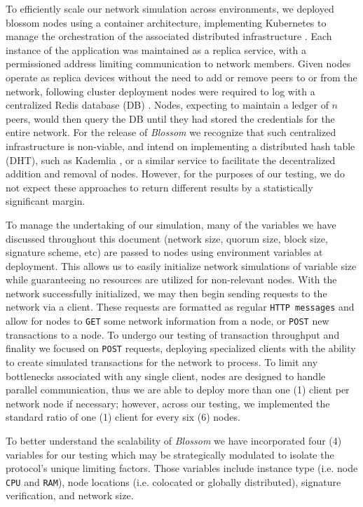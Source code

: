 To efficiently scale our network simulation across environments, we deployed blossom nodes using a container architecture, implementing Kubernetes to manage the orchestration of the associated distributed infrastructure \cite{burns2022kubernetes}. Each instance of the application was maintained as a replica service, with a permissioned address limiting communication to network members.  Given nodes operate as replica devices without the need to add or remove peers to or from the network, following cluster deployment nodes were required to log with a centralized Redis database (DB) \cite{carlson2013redis}. Nodes, expecting to maintain a ledger of $n$ peers, would then query the DB until they had stored the credentials for the entire network. For the release of \textit{Blossom} we recognize that such centralized infrastructure is non-viable, and intend on implementing a distributed hash table (DHT), such as Kademlia \cite{Maymounkov2002-in}, or a similar service to facilitate the decentralized addition and removal of nodes. However, for the purposes of our testing, we do not expect these approaches to return different results by a statistically significant margin.

To manage the undertaking of our simulation, many of the variables we have discussed throughout this document (network size, quorum size, block size, signature scheme, etc) are passed to nodes using environment variables at deployment. This allows us to easily initialize network simulations of variable size while guaranteeing no resources are utilized for non-relevant nodes. With the network successfully initialized, we may then begin sending requests to the network via a client. These requests are formatted as regular \texttt{HTTP messages} and allow for nodes to \texttt{GET} some network information from a node, or \texttt{POST} new transactions to a node. To undergo our testing of transaction throughput and finality we focused on \texttt{POST} requests, deploying specialized clients with the ability to create simulated transactions for the network to process. To limit any bottlenecks associated with any single client, nodes are designed to handle parallel communication, thus we are able to deploy more than one (1) client per network node if necessary; however, across our testing, we implemented the standard ratio of one (1) client for every six (6) nodes.

To better understand the scalability of \textit{Blossom} we have incorporated four (4) variables for our testing which may be strategically modulated to isolate the protocol’s unique limiting factors. Those variables include instance type (i.e. node \texttt{CPU} and \texttt{RAM}), node locations (i.e. colocated or globally distributed), signature verification, and network size.

